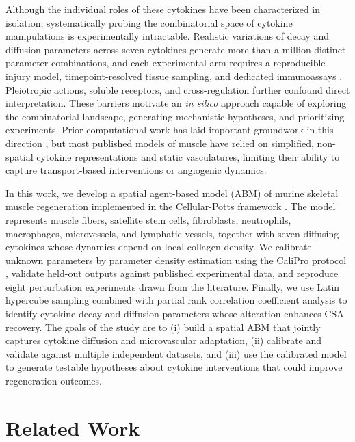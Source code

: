 \documentclass[10pt,letterpaper]{article}
\begin{document}
Although the individual roles of these cytokines have been characterized in isolation, systematically probing the combinatorial space of cytokine manipulations is experimentally intractable. Realistic variations of decay and diffusion parameters across seven cytokines generate more than a million distinct parameter combinations, and each experimental arm requires a reproducible injury model, timepoint-resolved tissue sampling, and dedicated immunoassays \cite{wehling2009interleukin}. Pleiotropic actions, soluble receptors, and cross-regulation further confound direct interpretation. These barriers motivate an \emph{in silico} approach capable of exploring the combinatorial landscape, generating mechanistic hypotheses, and prioritizing experiments. Prior computational work has laid important groundwork in this direction \cite{virgilio2015multiscale,martin2017agent}, but most published models of muscle have relied on simplified, non-spatial cytokine representations and static vasculatures, limiting their ability to capture transport-based interventions or angiogenic dynamics.

In this work, we develop a spatial agent-based model (ABM) of murine skeletal muscle regeneration implemented in the Cellular-Potts framework \cite{graner1992simulation,swat2012compucell3d}. The model represents muscle fibers, satellite stem cells, fibroblasts, neutrophils, macrophages, microvessels, and lymphatic vessels, together with seven diffusing cytokines whose dynamics depend on local collagen density. We calibrate unknown parameters by parameter density estimation using the CaliPro protocol \cite{joslyn2021calipro}, validate held-out outputs against published experimental data, and reproduce eight perturbation experiments drawn from the literature. Finally, we use Latin hypercube sampling combined with partial rank correlation coefficient analysis \cite{marino2008sensitivity} to identify cytokine decay and diffusion parameters whose alteration enhances CSA recovery. The goals of the study are to (i) build a spatial ABM that jointly captures cytokine diffusion and microvascular adaptation, (ii) calibrate and validate against multiple independent datasets, and (iii) use the calibrated model to generate testable hypotheses about cytokine interventions that could improve regeneration outcomes.

\section{Related Work}
\label{sec:related}
\end{document}
